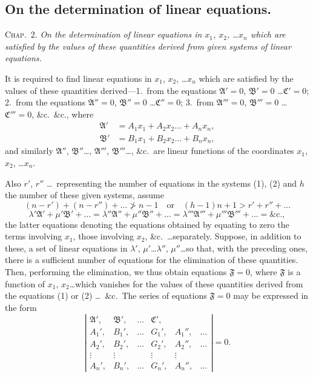 \documentclass[11pt,a4paper]{article}
\theoremstyle{plain}
\theoremstyle{definition}
\theoremstyle{remark}
\begin{document}
\newpage
\subsection{On the determination of linear equations.}

\textsc{Chap.\ 2.} \textit{On the determination of linear equations in $x_1$, $x_2$, \ldots $x_n$ which are
satisfied by the values of these quantities derived from given systems of linear equations.}

It is required to find linear equations in $x_1$, $x_2$, \ldots $x_n$ which are satisfied by the values
of these quantities derived---1.\ from the equations $\mathfrak{A}'=0$, $\mathfrak{B}'=0$ \ldots $\mathfrak{C}'=0$;
2.\ from the equations $\mathfrak{A}''=0$, $\mathfrak{B}''=0$ \ldots $\mathfrak{C}''=0$;
3.\ from $\mathfrak{A}'''=0$, $\mathfrak{B}'''=0$ \ldots $\mathfrak{C}'''=0$, \&c.\ \&c., where
\begin{align*}
\mathfrak{A}' &= A_1 x_1 + A_2 x_2 \ldots + A_n x_n \tag{1},\\
\mathfrak{B}' &= B_1 x_1 + B_2 x_2 \ldots + B_n x_n,
\end{align*}
and similarly $\mathfrak{A}''$, $\mathfrak{B}''$\ldots, $\mathfrak{A}'''$, $\mathfrak{B}'''$\ldots, \&c.\ are linear functions of the coordinates $x_1$, $x_2$, \ldots $x_n$.

Also $r'$, $r''$ \ldots\ representing the number of equations in the systems (1), (2)
and $h$ the number of these given systems, assume
\[
(n-r') + (n-r'') + \ldots \not> n-1 \quad \text{or} \quad (h-1)n+1 > r' + r'' + \ldots
\]
\[
\lambda' \mathfrak{A}' + \mu' \mathfrak{B}' + \ldots = \lambda'' \mathfrak{A}'' + \mu'' \mathfrak{B}'' + \ldots = \lambda''' \mathfrak{A}''' + \mu''' \mathfrak{B}''' + \ldots = \text{\&c.}
\tag{2},
\]
the latter equations denoting the equations obtained by equating to zero the terms
involving $x_1$, those involving $x_2$, \&c.\ \ldots separately. Suppose, in addition to these, a
set of linear equations in $\lambda'$, $\mu'$\ldots $\lambda''$, $\mu''$\ldots so that, with the preceding ones, there
is a sufficient number of equations for the elimination of these quantities. Then,
performing the elimination, we thus obtain equations $\mathfrak{F}=0$, where $\mathfrak{F}$ is a function of
$x_1$, $x_2$\ldots which vanishes for the values of these quantities derived from the equations
(1) or (2) \ldots\ \&c.\ The series of equations $\mathfrak{F}=0$ may be expressed in the form
\[
\left|
\begin{array}{cccccc}
\mathfrak{A}', & \mathfrak{B}', & \ldots & \mathfrak{C}', & & \\
A_1', & B_1', & \ldots & G_1', & A_1'', & \ldots \\
A_2', & B_2', & \ldots & G_2', & A_2'', & \ldots \\
\vdots & \vdots & & \vdots & \vdots & \\
A_n', & B_n', & \ldots & G_n', & A_n'', & \ldots
\end{array}
\right| = 0
\tag{3}.
\]
\end{document}
